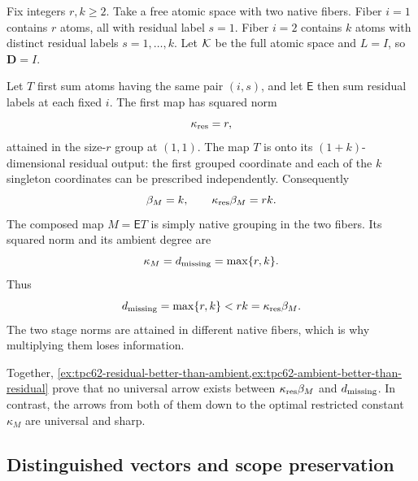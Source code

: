 \begin{example}
\label{ex:tpc62-ambient-better-than-residual}
Fix integers \(r,k\ge2\).  Take a free atomic space with two native
fibers.  Fiber \(i=1\) contains \(r\) atoms, all with residual label
\(s=1\).  Fiber \(i=2\) contains \(k\) atoms with distinct residual
labels \(s=1,\ldots,k\).  Let \(\mathcal K\) be the full atomic space and
\(L=I\), so \(\mathbf D=I\).

Let \(T\) first sum atoms having the same pair \((i,s)\), and let
\(\mathsf E\) then sum residual labels at each fixed \(i\).  The first
map has squared norm
\begin{equation}
 \kappa_{\rm res}=r,
 \label{eq:tpc62-residual-first-stage-r}
\end{equation}
attained in the size-\(r\) group at \((1,1)\).  The map \(T\) is onto its
\((1+k)\)-dimensional residual output: the first grouped coordinate and
each of the \(k\) singleton coordinates can be prescribed independently.
Consequently
\begin{equation}
 \beta_M=k,
 \qquad
 \kappa_{\rm res}\beta_M=rk.
 \label{eq:tpc62-residual-product-rk}
\end{equation}
The composed map \(M=\mathsf ET\) is simply native grouping in the two
fibers.  Its squared norm and its ambient degree are
\begin{equation}
 \kappa_M=d_{\rm missing}=\max\{r,k\}.
 \label{eq:tpc62-ambient-max-rk}
\end{equation}
Thus
\begin{equation}
 d_{\rm missing}=\max\{r,k\}<rk
 =\kappa_{\rm res}\beta_M.
 \label{eq:tpc62-ambient-strictly-better}
\end{equation}
The two stage norms are attained in different native fibers, which is why
multiplying them loses information.
\end{example}

Together,
\cref{ex:tpc62-residual-better-than-ambient,ex:tpc62-ambient-better-than-residual}
prove that no universal arrow exists between
\(\kappa_{\rm res}\beta_M\) and \(d_{\rm missing}\).  In contrast, the
arrows from both of them down to the optimal restricted constant
\(\kappa_M\) are universal and sharp.

\subsection{Distinguished vectors and scope preservation}

